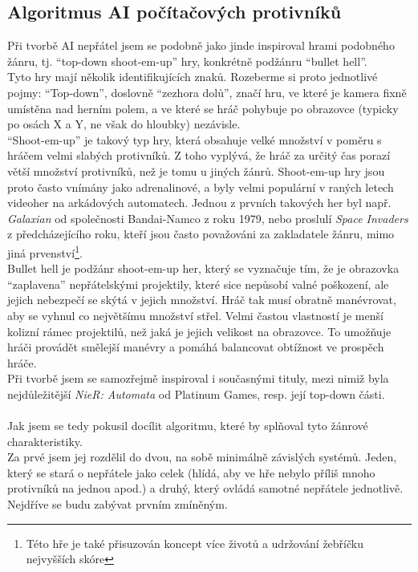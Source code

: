 \documentclass[12pt,a4paper,hidelinks]{article}
\begin{document}
\subsection{Algoritmus AI počítačových protivníků}
Při tvorbě AI nepřátel jsem se podobně jako jinde inspiroval hrami podobného žánru, tj. \enquote{top-down shoot-em-up} hry, konkrétně podžánru \enquote{bullet hell}.\\
Tyto hry mají několik identifikujících znaků. Rozeberme si proto jednotlivé pojmy:
\enquote{Top-down}, doslovně \enquote{zezhora dolů}, značí hru, ve které je kamera fixně umístěna nad herním polem, a ve které se hráč pohybuje po obrazovce (typicky po osách X a Y, ne však do hloubky) nezávisle.\\
\enquote{Shoot-em-up} je takový typ hry, která obsahuje velké množství v poměru s hráčem velmi slabých protivníků. Z toho vyplývá, že hráč za určitý čas porazí větší množství protivníků, než je tomu u jiných žánrů. Shoot-em-up hry jsou proto často vnímány jako adrenalinové, a byly velmi populární v raných letech videoher na arkádových automatech. Jednou z prvních takových her byl např. \textit{Galaxian} od společnosti Bandai-Namco z roku 1979, nebo proslulí \textit{Space Invaders} z předcházejícího roku, kteří jsou často považováni za zakladatele žánru, mimo jiná prvenství\footnote{Této hře je také přisuzován koncept více životů a udržování žebříčku nejvyšších skóre}.\\
Bullet hell je podžánr shoot-em-up her, který se vyznačuje tím, že je obrazovka \enquote{zaplavena} nepřátelskými projektily, které sice nepůsobí valné poškození, ale jejich nebezpečí se skýtá v jejich množství. Hráč tak musí obratně manévrovat, aby se vyhnul co největšímu množství střel. Velmi častou vlastností je menší kolizní rámec projektilů, než jaká je jejich velikost na obrazovce. To umožňuje hráči provádět smělejší manévry a pomáhá balancovat obtížnost ve prospěch hráče.\\
Při tvorbě jsem se samozřejmě inspiroval i současnými tituly, mezi nimiž byla nejdůležitější \textit{NieR: Automata} od Platinum Games, resp. její top-down části.\\
\\
Jak jsem se tedy pokusil docílit algoritmu, které by splňoval tyto žánrové charakteristiky.\\
Za prvé jsem jej rozdělil do dvou, na sobě minimálně závislých systémů. Jeden, který se stará o nepřátele jako celek (hlídá, aby ve hře nebylo příliš mnoho protivníků na jednou apod.) a druhý, který ovládá samotné nepřátele jednotlivě. Nejdříve se budu zabývat prvním zmíněným.\\
\end{document}
